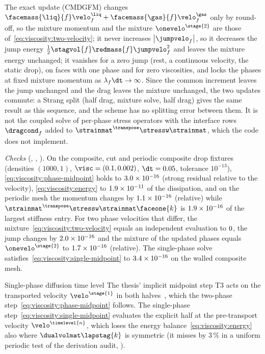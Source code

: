 The exact update (CMDGFM) changes $\facemass{\liq}{f}\velo^{\liq}_f+\facemass{\gas}{f}\velo^{\gas}_f$
only by round-off, so the mixture momentum and the mixture
$\onevelo^{\stage{2}}$ are those of~\cref{eq:viscosity:two-velocity}; it
never increases $\abs{\jumpvelo_f}$, so it decreases the jump energy
$\half\stagvol{f}\redmass{f}\jumpvelo_f^2$ and leaves the mixture energy
unchanged; it vanishes for a zero jump (rest, a continuous velocity, the
static drop), on faces with one phase and for zero viscosities, and locks the
phases at fixed mixture momentum as $\lambda_f\dt\to\infty$. Since the common
increment leaves the jump unchanged and the drag leaves the mixture
unchanged, the two updates commute: a Strang split (half drag, mixture
solve, half drag) gives the same result as this sequence, and the scheme has
no splitting error between them. It is not the coupled solve of per-phase
stress operators with the interface rows $\dragcond_f$ added to
$\strainmat^{\transpose}\stressw\strainmat$, which the code does not
implement.

\begin{sloppypar}
\emph{Checks} (, ,
). On the composite, cut and periodic
composite drop fixtures (densities $(1000,1)$, $\visc=(0.1,0.002)$,
$\dt=0.05$, tolerance $10^{-13}$), \cref{eq:viscosity:phase-midpoint} holds
to $3.0\times10^{-16}$ (strong residual relative to the velocity),
\cref{eq:viscosity:energy} to $1.9\times10^{-11}$ of the dissipation, and on
the periodic mesh the momentum changes by $1.1\times10^{-16}$ (relative) while
$\strainmat^{\transpose}\stressw\strainmat\faceone{k}$ is $1.9\times10^{-16}$ of
the largest stiffness entry. For two phase velocities that differ, the
mixture~\cref{eq:viscosity:two-velocity} equals an independent evaluation to
$0$, the jump changes by $2.0\times10^{-16}$ and the mixture of the
updated phases equals $\onevelo^{\stage{2}}$ to $1.7\times10^{-16}$
(relative). The single-phase solve
satisfies~\cref{eq:viscosity:single-midpoint} to $3.4\times10^{-16}$ on
the walled composite mesh.
\end{sloppypar}

\begin{deviation}{Single-phase diffusion time level}\label{dev:viscosity:time-level}
The thesis' implicit midpoint step T3 acts on the transported velocity
$\velo^{\stage{1}}$ in both halves~, which the
two-phase step~\cref{eq:viscosity:phase-midpoint} follows. The single-phase
step~\cref{eq:viscosity:single-midpoint} evaluates the explicit half at the
pre-transport velocity $\velo^{\timelevel{n}}$, which loses the energy
balance~\cref{eq:viscosity:energy} also where $\dualvolmat\lapstag{k}$ is
symmetric (it misses by $3\,\%$ in a uniform periodic test of the
derivation audit, ).
\end{deviation}


